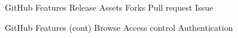 \documentclass[aspectratio=169]{beamer}
\begin{document}



\begin{frame}{GitHub Features}
  Release
  Assets
  Forks
  Pull request
  Issue
\end{frame}


\begin{frame}{GitHub Features (cont)}
  Browse
  Access control
  Authentication
\end{frame}
\end{document}
